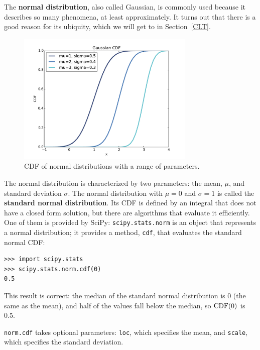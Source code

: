 \documentclass[12pt]{book}
\begin{document}
The {\bf normal distribution}, also called Gaussian, is commonly
used because it describes so many phenomena, at least approximately.
It turns out that there is a good reason for its ubiquity, which we
will get to in Section~\ref{CLT}.

%
%

\begin{figure}
\centerline{\includegraphics[height=2.5in]{figs/analytic_gaussian_cdf.pdf}}
\caption{CDF of normal distributions with a range of parameters.}
\label{analytic_gaussian_cdf}
\end{figure}

The normal distribution is characterized by two parameters: the mean,
$\mu$, and standard deviation $\sigma$.  The normal distribution with
$\mu=0$ and $\sigma=1$ is called the {\bf standard normal
  distribution}.  Its CDF is defined by an integral that does not have
a closed form solution, but there are algorithms that evaluate it
efficiently.  One of them is provided by SciPy: {\tt scipy.stats.norm}
is an object that represents a normal distribution; it provides a
method, {\tt cdf}, that evaluates the standard normal CDF:

\begin{verbatim}
>>> import scipy.stats
>>> scipy.stats.norm.cdf(0)
0.5
\end{verbatim}

This result is correct: the median of the standard normal distribution
is 0 (the same as the mean), and half of the values fall below the
median, so $\mathrm{CDF}(0)$ is 0.5.

{\tt norm.cdf} takes optional parameters: {\tt loc}, which
specifies the mean, and {\tt scale}, which specifies the
standard deviation.
\end{document}
